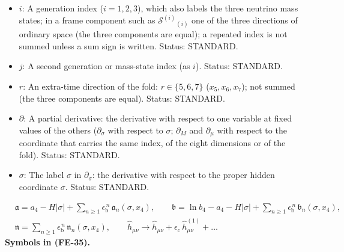 \documentclass[
  10pt,
]{article}
\begin{document}
\begin{itemize}
  \(R^{(a)(b)}{}_{(c)(d)}\) its frame components,
  \(R^{(a)(b)}{}_{(a)(b)}\) (no sum) the sectional curvature of the
  frame plane \((a, b)\). Unit: 1/length\(^2\). Status: STANDARD.
\item
  \(i\): A generation index (\(i = 1, 2, 3\)), which also labels the
  three neutrino mass states; in a frame component such as
  \(\mathcal{S}^{(i)}{}_{(i)}\) one of the three directions of ordinary
  space (the three components are equal); a repeated index is not summed
  unless a sum sign is written. Status: STANDARD.
\item
  \(j\): A second generation or mass-state index (as \(i\)). Status:
  STANDARD.
\item
  \(r\): An extra-time direction of the fold: \(r \in \{5, 6, 7\}\)
  (\(x_5, x_6, x_7\)); not summed (the three components are equal).
  Status: STANDARD.
\item
  \(\partial\): A partial derivative: the derivative with respect to one
  variable at fixed values of the others (\(\partial_\sigma\) with
  respect to \(\sigma\); \(\partial_M\) and \(\partial_\mu\) with
  respect to the coordinate that carries the same index, of the eight
  dimensions or of the fold). Status: STANDARD.
\item
  \(\sigma\): The label \(\sigma\) in \(\partial_\sigma\): the
  derivative with respect to the proper hidden coordinate \(\sigma\).
  Status: STANDARD.
\end{itemize}

\[
\begin{aligned}
&\mathfrak{a} = a_4 - H\lvert\sigma\rvert + \sum_{n\ge1}\epsilon_{\mathrm{b}}^{\,n}\,\mathfrak{a}_n(\sigma, x_4),\qquad
 \mathfrak{b} = \ln b_4 - a_4 - H\lvert\sigma\rvert + \sum_{n\ge1}\epsilon_{\mathrm{b}}^{\,n}\,\mathfrak{b}_n(\sigma, x_4),\\
&\mathfrak{n} = \sum_{n\ge1}\epsilon_{\mathrm{b}}^{\,n}\,\mathfrak{n}_n(\sigma, x_4),\qquad
 \hat h_{\mu\nu} \to \hat h_{\mu\nu} + \epsilon_{\mathrm{c}}\,\hat h^{(1)}_{\mu\nu} + \dots
\end{aligned} \tag{FE-35}
\] \textbf{Symbols in (FE-35).}
\end{document}
